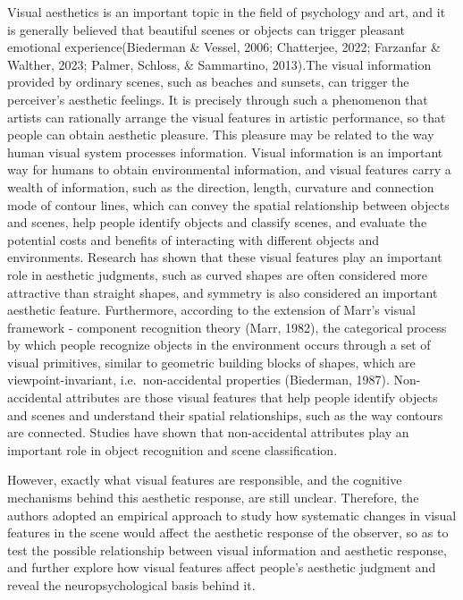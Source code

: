 \documentclass[
  man,floatsintext]{apa6}
\begin{document}
Visual aesthetics is an important topic in the field of psychology and art, and it is generally believed that beautiful scenes or objects can trigger pleasant emotional experience(Biederman \& Vessel, 2006; Chatterjee, 2022; Farzanfar \& Walther, 2023; Palmer, Schloss, \& Sammartino, 2013).The visual information provided by ordinary scenes, such as beaches and sunsets, can trigger the perceiver's aesthetic feelings. It is precisely through such a phenomenon that artists can rationally arrange the visual features in artistic performance, so that people can obtain aesthetic pleasure. This pleasure may be related to the way human visual system processes information. Visual information is an important way for humans to obtain environmental information, and visual features carry a wealth of information, such as the direction, length, curvature and connection mode of contour lines, which can convey the spatial relationship between objects and scenes, help people identify objects and classify scenes, and evaluate the potential costs and benefits of interacting with different objects and environments. Research has shown that these visual features play an important role in aesthetic judgments, such as curved shapes are often considered more attractive than straight shapes, and symmetry is also considered an important aesthetic feature. Furthermore, according to the extension of Marr's visual framework - component recognition theory (Marr, 1982), the categorical process by which people recognize objects in the environment occurs through a set of visual primitives, similar to geometric building blocks of shapes, which are viewpoint-invariant, i.e.~non-accidental properties (Biederman, 1987). Non-accidental attributes are those visual features that help people identify objects and scenes and understand their spatial relationships, such as the way contours are connected. Studies have shown that non-accidental attributes play an important role in object recognition and scene classification.

However, exactly what visual features are responsible, and the cognitive mechanisms behind this aesthetic response, are still unclear. Therefore, the authors adopted an empirical approach to study how systematic changes in visual features in the scene would affect the aesthetic response of the observer, so as to test the possible relationship between visual information and aesthetic response, and further explore how visual features affect people's aesthetic judgment and reveal the neuropsychological basis behind it.
\end{document}
